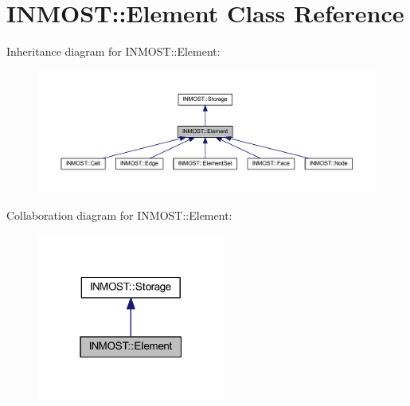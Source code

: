 \hypertarget{classINMOST_1_1Element}{\section{I\-N\-M\-O\-S\-T\-:\-:Element Class Reference}
\label{classINMOST_1_1Element}
}


Inheritance diagram for I\-N\-M\-O\-S\-T\-:\-:Element\-:\nopagebreak
\begin{figure}[H]
\begin{center}
\leavevmode
\includegraphics[width=350pt]{classINMOST_1_1Element__inherit__graph}
\end{center}
\end{figure}


Collaboration diagram for I\-N\-M\-O\-S\-T\-:\-:Element\-:\nopagebreak
\begin{figure}[H]
\begin{center}
\leavevmode
\includegraphics[width=175pt]{classINMOST_1_1Element__coll__graph}
\end{center}
\end{figure}
